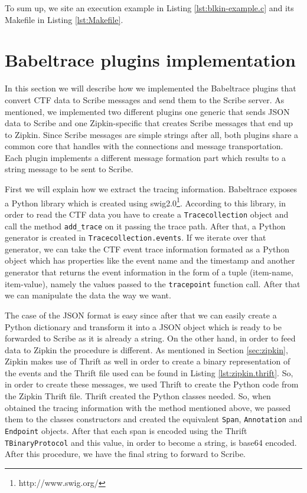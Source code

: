 To sum up, we site an execution example in Listing \ref{lst:blkin-example.c} and
its Makefile in Listing \ref{lst:Makefile}.


\section{Babeltrace plugins implementation}

In this section we will describe how we implemented the Babeltrace plugins that
convert CTF data to Scribe messages and send them to the Scribe server. As
mentioned, we implemented two different plugins one generic that sends JSON data
to Scribe and one Zipkin-specific that creates Scribe messages that end up to
Zipkin. Since Scribe messages are simple strings after all, both plugins share a
common core that handles with the connections and message transportation. Each
plugin implements a different message formation part which results to a string
message to be sent to Scribe.

First we will explain how we extract the tracing information. Babeltrace
exposes a Python library which is created using
swig2.0\footnote{http://www.swig.org/}.  According to this library, in order to
read the CTF data you have to create a \texttt{Tracecollection} object and call
the method \texttt{add\_trace} on it passing the trace path. After that, a
Python generator is created in \texttt{Tracecollection.events}. If we iterate
over that generator, we can take the CTF event trace information formated as a
Python object which has properties like the event name and the timestamp and
another generator that returns the event information in the form of a tuple
(item-name, item-value), namely the values passed to the \texttt{tracepoint}
function call. After that we can manipulate the data the way we want.

The case of the JSON format is easy since after that we can easily create a
Python dictionary and transform it into a JSON object which is ready to be
forwarded to Scribe as it is already a string. On the other hand, in order to
feed data to Zipkin the procedure is different. As mentioned in Section
\ref{sec:zipkin}, Zipkin makes use of Thrift as well in order to create a binary
representation of the events and the Thrift file used can be found in Listing
\ref{lst:zipkin.thrift}. So, in order to create these messages, we used Thrift
to create the Python code from the Zipkin Thrift file. Thrift created the Python
classes needed. So, when obtained the tracing information with the method
mentioned above, we passed them to the classes constructors and created the
equivalent \texttt{Span}, \texttt{Annotation} and \texttt{Endpoint} objects.
After that each span is encoded using the Thrift \texttt{TBinaryProtocol} and
this value, in order to become a string, is base64 encoded. After this
procedure, we have the final string to forward to Scribe.

